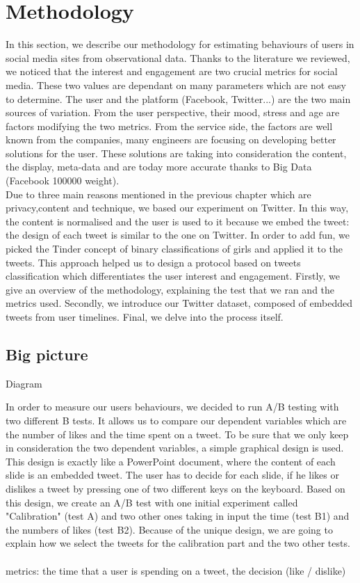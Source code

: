 \chapter{Methodology}
In this section, we describe our methodology for estimating behaviours of users in social media sites from observational data. Thanks to the literature we reviewed, we noticed that the interest and engagement are two crucial metrics for social media. These two values are dependant on many parameters which are not easy to determine. The user and the platform (Facebook, Twitter...) are the two main sources of variation. From the user perspective, their mood, stress and age are factors modifying the two metrics. From the service side, the factors are well known from the companies, many engineers are focusing on developing better solutions for the user. These solutions are taking into consideration the content, the display, meta-data and are today more accurate thanks to Big Data (Facebook 100000 weight).\\
Due to three main reasons mentioned in the previous chapter which are privacy,content and technique, we based our experiment on Twitter. In this way, the content is normalised and the user is used to it because we embed the tweet: the design of each tweet is similar to the one on Twitter. In order to add fun, we picked the Tinder concept of binary classifications of girls and applied it to the tweets. This approach helped us to design a protocol based on tweets classification which differentiates the user interest and engagement.
Firstly, we give an overview of the methodology, explaining the test that we ran and the metrics used. Secondly, we introduce our Twitter dataset, composed of embedded tweets from user timelines. Final, we delve into the process itself.

\section{Big picture}

Diagram

In order to measure our users behaviours, we decided to run A/B testing with two different B tests. It allows us 
to compare our dependent variables which are the number of likes and the time spent on a tweet. To be sure 
that we only keep in consideration the two dependent variables, a simple graphical design is used. This 
design is exactly like a PowerPoint document, where the content of each slide is an embedded tweet. The 
user has to decide for each slide, if he likes or dislikes a tweet by pressing one of two different keys on the 
keyboard. Based on this design, we create an A/B test with one initial experiment called "Calibration" (test A) 
and two other ones taking in input the time (test B1) and the numbers of likes (test B2). Because of the unique 
design, we are going to explain how we select the tweets for the calibration part and the two other tests. \\
\\
metrics: the time that a user is spending on a tweet, the decision (like / dislike) 

